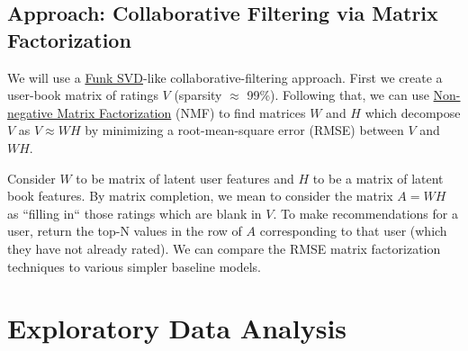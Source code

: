 \documentclass[11pt]{article}
\begin{document}
    \hypertarget{approach}{%
\subsection{Approach: Collaborative Filtering via Matrix Factorization}}

We will use a \href{https://en.wikipedia.org/wiki/Matrix_factorization_(recommender_systems)#Funk_SVD}{Funk SVD}-like collaborative-filtering approach.
First we create a user-book matrix of ratings $V$ (sparsity $\approx$ 99\%). 
Following that, we can use \href{http://scikit-learn.org/stable/modules/generated/sklearn.decomposition.NMF.html}{Non-negative Matrix Factorization} (NMF) to find matrices $W$ and $H$ which decompose $V$ as $V \approx WH$ by minimizing a root-mean-square error (RMSE) between $V$ and $WH$.

Consider $W$ to be matrix of latent user features and $H$ to be a matrix of latent book features. By matrix completion, we mean to consider the matrix $A = WH$ as ``filling in`` those ratings which are blank in $V$.
To make recommendations for a user, return the top-N values in the row of $A$ corresponding to that user (which they have not already rated). We can compare the RMSE matrix factorization techniques to various simpler baseline models.



    \hypertarget{exploratory-data-analysis}{%
\section{Exploratory Data Analysis}\label{exploratory-data-analysis}}
   
\end{document}
